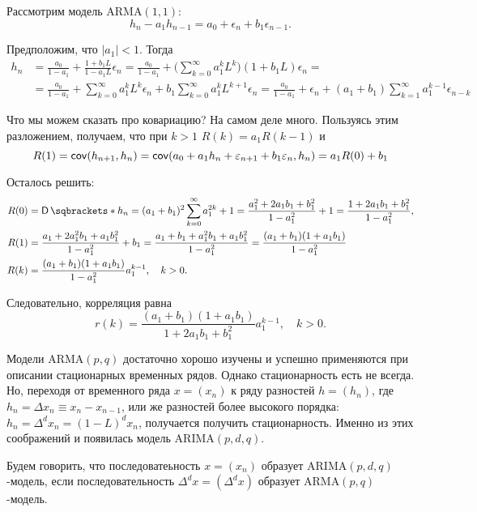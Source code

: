 Рассмотрим модель \(\mathrm{ARMA}(1, 1)\):
\[
	h_{n} - a_{1}h_{n - 1} = a_{0} + \epsilon_{n} + b_{1}\epsilon_{n - 1}.
\]

Предположим, что \(|a_{1}| < 1\). Тогда
\begin{align*}
	h_{n} &= \frac{a_{0}}{1 - a_{1}} + \frac{1 + b_{1}L}{1 - 
	a_{1}L}\epsilon_{n} = \frac{a_{0}}{1 - a_{1}} + \bigg(\sum_{k = 0}^{\infty} 
	a_{1}^{k}L^{k}\bigg)(1 + b_{1}L)\epsilon_{n} = \\
	&= \frac{a_{0}}{1 - a_{1}} + \sum_{k = 0}^{\infty} 
	a_{1}^{k}L^{k}\epsilon_{n} + b_{1}\sum_{k = 0}^{\infty} a_{1}^{k}L^{k + 
	1}\epsilon_{n} = \frac{a_{0}}{1 - a_{1}} + \epsilon_{n} + (a_{1} + 
	b_{1})\sum_{k = 1}^{\infty} a_{1}^{k - 1}\epsilon_{n - k}
\end{align*}

Что мы можем сказать про ковариацию? На самом деле много. Пользуясь этим 
разложением, получаем, что при \(k > 1\) \(R(k) = a_{1}R(k - 1)\) и
\[
	R(1) = \operatorname{\mathsf{cov}}(h_{n + 1}, h_{n}) = \operatorname{\mathsf{cov}}(a_{0} + a_{1}h_{n} + \varepsilon_{n + 1} 
	+ b_{1}\varepsilon_{n}, h_{n}) = a_{1}R(0) + b_{1}
\]

Осталось решить:
\begin{align*}
	R(0) &= \D{h_{n}} = (a_{1} + b_{1})^{2}\sum_{k = 0}^{\infty}a_{1}^{2k} + 1 
	= \frac{a_{1}^{2} + 2a_{1}b_{1} + b_{1}^{2}}{1 - a_{1}^{2}} + 1 = \frac{1 + 
	2a_{1}b_{1} + b_{1}^{2}}{1 - a_{1}^{2}},\\
	R(1) &= \frac{a_{1} + 2a_{1}^{2}b_{1} + a_{1}b_{1}^{2}}{1 - a_{1}^{2}} + 
	b_{1} = \frac{a_{1} + b_{1} + a_{1}^{2}b_{1} + a_{1}b_{1}^{2}}{1 - 
	a_{1}^{2}} = \frac{(a_{1} + b_{1})(1 + a_{1}b_{1})}{1 - a_{1}^{2}} \\
	R(k) &= \frac{(a_{1} + b_{1})(1 + a_{1}b_{1})}{1 - a_{1}^{2}}a_{1}^{k - 1}, 
	\quad k > 0.
\end{align*}

Следовательно, корреляция равна
\[
	r(k) = \frac{(a_{1} + b_{1})(1 + a_{1}b_{1})}{1 + 2a_{1}b_{1} + 
	b_{1}^{2}}a_{1}^{k - 1}, \quad k > 0.
\]

Модели \(\mathrm{ARMA}(p, q)\) достаточно хорошо изучены и успешно применяются 
при описании стационарных временных рядов. Однако стационарность есть не 
всегда. Но, переходя от временного ряда \(x = (x_{n})\) к ряду разностей \(h = 
(h_{n})\), где \(h_{n} = \Delta x_{n} \equiv x_{n} - x_{n - 1}\), или же 
разностей более высокого порядка: \(h_{n} = \Delta^{d} x_{n} = (1 - 
L)^{d}x_{n}\), получается получить стационарность. Именно из этих соображений и 
появилась модель \(\mathrm{ARIMA}(p, d, q)\). 
\begin{definition}
	Будем говорить, что последоватеьность \(x = (x_{n})\) образует 
	\(\mathrm{ARIMA}(p, d, q)\)-модель, если последовательность \(\Delta^{d} x 
	= (\Delta^{d} x)\) образует \(\mathrm{ARMA}(p, q)\)-модель.
\end{definition}

